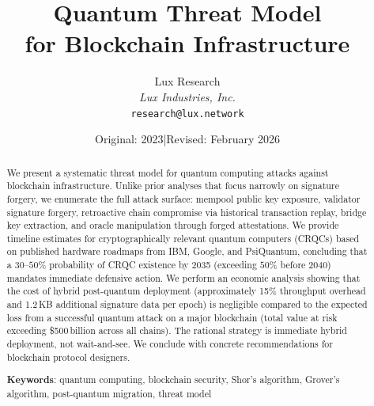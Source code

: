 \documentclass[11pt,a4paper]{article}
\title{\textbf{Quantum Threat Model\\for Blockchain Infrastructure}}
\author{
Lux Research \\
\textit{Lux Industries, Inc.}\\
\texttt{research@lux.network}
}
\date{Original: 2023\quad|\quad Revised: February 2026}
\begin{document}
\luxcoverpage

\begin{abstract}
We present a systematic threat model for quantum computing attacks against blockchain
infrastructure. Unlike prior analyses that focus narrowly on signature forgery, we
enumerate the full attack surface: mempool public key exposure, validator signature
forgery, retroactive chain compromise via historical transaction replay, bridge key
extraction, and oracle manipulation through forged attestations. We provide timeline
estimates for cryptographically relevant quantum computers (CRQCs) based on published
hardware roadmaps from IBM, Google, and PsiQuantum, concluding that a
$30$--$50\%$ probability of CRQC existence by 2035 (exceeding $50\%$ before 2040)
mandates immediate defensive action.
We perform an economic analysis showing that the cost of hybrid post-quantum deployment
(approximately 15\% throughput overhead and 1.2\,KB additional signature data per epoch)
is negligible compared to the expected loss from a successful quantum attack on a major
blockchain (total value at risk exceeding \$500\,billion across all chains). The
rational strategy is immediate hybrid deployment, not wait-and-see. We conclude with
concrete recommendations for blockchain protocol designers.

\textbf{Keywords}: quantum computing, blockchain security, Shor's algorithm,
Grover's algorithm, post-quantum migration, threat model
\end{abstract}

\tableofcontents
\newpage










\end{document}
